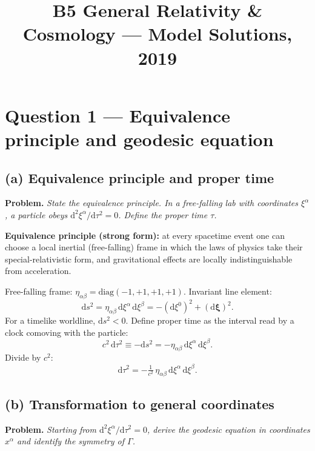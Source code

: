 \documentclass[11pt]{article}
\title{B5 General Relativity \& Cosmology --- Model Solutions, 2019}
\author{}
\date{}
\newcommand{\de}{\mathrm{d}}
\begin{document}
\maketitle

\section*{Question 1 --- Equivalence principle and geodesic equation}

\subsection*{(a) Equivalence principle and proper time}

\textbf{Problem.} \emph{State the equivalence principle. In a free-falling lab with coordinates $\xi^\alpha$, a particle obeys $\de^2\xi^\alpha/\de\tau^2 = 0$. Define the proper time $\tau$.}

\textbf{Equivalence principle (strong form):} at every spacetime event one can choose a local inertial (free-falling) frame in which the laws of physics take their special-relativistic form, and gravitational effects are locally indistinguishable from acceleration.

Free-falling frame: $\eta_{\alpha\beta}=\mathrm{diag}(-1,+1,+1,+1)$. Invariant line element:
\[
\de s^2 = \eta_{\alpha\beta}\,\de\xi^\alpha\,\de\xi^\beta = -(\de\xi^0)^2 + (\de\bm\xi)^2.
\]
For a timelike worldline, $\de s^2 < 0$. Define proper time as the interval read by a clock comoving with the particle:
\[
c^2\,\de\tau^2 \equiv -\de s^2 = -\eta_{\alpha\beta}\,\de\xi^\alpha\,\de\xi^\beta.
\]
Divide by $c^2$:
\[
\boxed{\;\de\tau^2 = -\tfrac{1}{c^2}\,\eta_{\alpha\beta}\,\de\xi^\alpha\,\de\xi^\beta.\;}
\]

\subsection*{(b) Transformation to general coordinates}

\textbf{Problem.} \emph{Starting from $\de^2\xi^\alpha/\de\tau^2 = 0$, derive the geodesic equation in coordinates $x^\alpha$ and identify the symmetry of $\Gamma$.}
\end{document}
